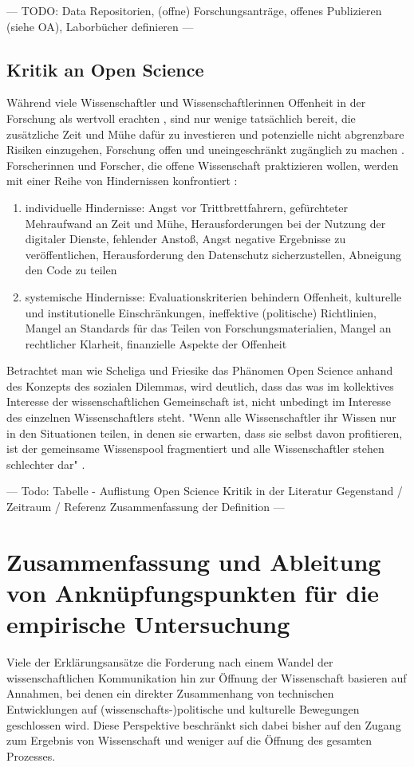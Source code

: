 --- TODO: Data Repositorien, (offne) Forschungsanträge, offenes Publizieren (siehe OA), Laborbücher definieren ---

\subsection{Kritik an Open Science}

Während viele Wissenschaftler und Wissenschaftlerinnen Offenheit in der Forschung als wertvoll erachten \cite{suchen}, sind nur wenige tatsächlich bereit, die zusätzliche Zeit und Mühe dafür zu investieren und potenzielle nicht abgrenzbare Risiken einzugehen, Forschung offen und uneingeschränkt zugänglich zu machen \cite{Scheliga_2014} \cite{Procter_2010}. Forscherinnen und Forscher, die offene Wissenschaft praktizieren wollen, werden mit einer Reihe von Hindernissen konfrontiert \cite{Scheliga_2014}:
\begin{enumerate}
\item individuelle Hindernisse: Angst vor Trittbrettfahrern, gefürchteter Mehraufwand an Zeit und Mühe, Herausforderungen bei der Nutzung der digitaler Dienste, fehlender Anstoß, Angst negative Ergebnisse zu veröffentlichen, Herausforderung den Datenschutz sicherzustellen, Abneigung den Code zu teilen
\item systemische Hindernisse: Evaluationskriterien behindern Offenheit, kulturelle und institutionelle Einschränkungen, ineffektive (politische) Richtlinien, Mangel an Standards für das Teilen von Forschungsmaterialien, Mangel an rechtlicher Klarheit, finanzielle Aspekte der Offenheit
\end{enumerate}

Betrachtet man wie Scheliga und Friesike das Phänomen Open Science anhand des Konzepts des sozialen Dilemmas, wird deutlich, dass das was im kollektives Interesse der wissenschaftlichen Gemeinschaft ist, nicht unbedingt im Interesse des einzelnen Wissenschaftlers steht. "Wenn alle Wissenschaftler ihr Wissen nur in den Situationen teilen, in denen sie erwarten, dass sie selbst davon profitieren, ist der gemeinsame Wissenspool fragmentiert und alle Wissenschaftler stehen schlechter dar" \cite{Scheliga_2014}.

--- Todo: Tabelle - Auflistung Open Science Kritik in der Literatur
Gegenstand / Zeitraum / Referenz
Zusammenfassung der Definition ---

\section{Zusammenfassung und Ableitung von Anknüpfungspunkten für die empirische Untersuchung}
Viele der Erklärungsansätze die Forderung nach einem Wandel der wissenschaftlichen Kommunikation hin zur Öffnung der Wissenschaft basieren auf Annahmen, bei denen ein direkter Zusammenhang von technischen Entwicklungen auf (wissenschafts-)politische und kulturelle Bewegungen geschlossen wird. Diese Perspektive beschränkt sich dabei bisher auf den Zugang zum Ergebnis von Wissenschaft und weniger auf die Öffnung des gesamten Prozesses.

